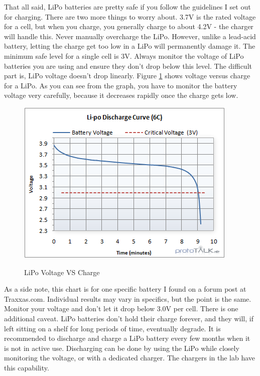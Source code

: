 That all said, LiPo batteries are pretty safe if you follow the guidelines I set out for charging. There are two more things to worry about. 3.7V is the rated voltage for a cell, but when you charge, you generally charge to about 4.2V - the charger will handle this. Never manually overcharge the LiPo. However, unlike a lead-acid battery, letting the charge get too low in a LiPo will permanently damage it. The minimum safe level for a single cell is 3V. Always monitor the voltage of LiPo batteries you are using and ensure they don't drop below this level. The difficult part is, LiPo voltage doesn't drop linearly. Figure \ref{fig:lipovoltage} shows voltage versus charge for a LiPo. As you can see from the graph, you have to monitor the battery voltage very carefully, because it decreases rapidly once the charge gets low.

\begin{figure}[h]
\centering
\includegraphics[scale=0.75]{lipovoltage.png}
\label{fig:lipovoltage}
\caption{LiPo Voltage VS Charge}
\end{figure}

As a side note, this chart is for one specific battery I found on a forum post at Traxxas.com. Individual results may vary in specifics, but the point is the same. Monitor your voltage and don't let it drop below 3.0V per cell. There is one additional caveat. LiPo batteries don't hold their charge forever, and they will, if left sitting on a shelf for long periods of time, eventually degrade. It is recommended to discharge and charge a LiPo battery every few months when it is not in active use. Discharging can be done by using the LiPo while closely monitoring the voltage, or with a dedicated charger. The chargers in the lab have this capability.


